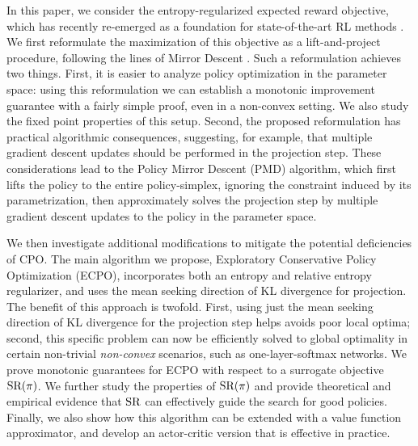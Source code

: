 In this paper, %
we consider the entropy-regularized expected reward objective,
which has recently re-emerged as a foundation for state-of-the-art RL methods
\citep{williams1991function,fox2015taming,schulman2017equivalence,nachum2017bridging,haarnoja2017reinforcement}. 
We first reformulate the maximization of 
this objective as a lift-and-project procedure,
following the lines of Mirror Descent
\citep{nemirovskii1983problem,beck2003mirror}.
Such a reformulation achieves two things.
First, %
it is easier to analyze policy optimization
in the parameter space:
using this reformulation we can establish a monotonic improvement guarantee
with a fairly simple proof,
even in a non-convex setting.
We also study the fixed point properties of this setup.
Second, the proposed reformulation has practical algorithmic consequences,
suggesting, for example,
that multiple gradient descent updates should be performed
in the projection step.
These considerations lead to the %
Policy Mirror Descent (PMD) algorithm,
which first lifts the policy to the entire policy-simplex,
ignoring the constraint induced by its parametrization,
then approximately solves the projection step by multiple
gradient descent updates to the policy in the parameter space. 
%
%

We then investigate
additional modifications to mitigate the potential deficiencies of CPO.
The main algorithm we propose, Exploratory Conservative Policy Optimization (ECPO),
incorporates both an entropy and relative entropy regularizer,
and uses the mean seeking direction of KL divergence for projection.
The benefit of this approach is twofold.
First, 
using just the mean seeking direction of KL divergence for the projection step
helps avoids poor local optima;
second,
this specific problem can now be efficiently solved to global optimality
in certain non-trivial \emph{non-convex} scenarios,
such as one-layer-softmax networks.
We prove monotonic guarantees for ECPO with respect to a surrogate objective $\text{SR}(\pi)$.
We further study the properties of $\text{SR}(\pi)$ and provide theoretical
and empirical evidence that $\text{SR}$ 
can effectively guide the search for good policies.
Finally, we also show how this algorithm can be extended 
with a value function approximator,
and develop an actor-critic version that is effective in practice.



